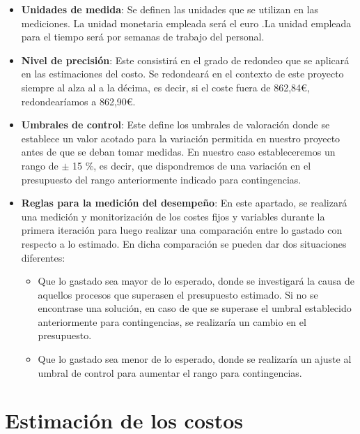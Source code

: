 \begin{itemize}

\item \textbf{Unidades de medida}: Se definen las unidades que se utilizan en las mediciones. La unidad monetaria empleada será el euro .La unidad empleada para el tiempo será por semanas de trabajo del personal.
\item \textbf{Nivel de precisión}: Este consistirá en el grado de redondeo que se aplicará en las estimaciones del costo. Se redondeará en el contexto de este proyecto siempre al alza al a la décima, es decir, si el coste fuera de 862,84\euro, redondearíamos a 862,90\euro.
\item \textbf{Umbrales de control}: Este define los umbrales de valoración donde se establece un valor acotado para la variación permitida en nuestro proyecto antes de que se deban tomar medidas. En nuestro caso estableceremos un rango de $\pm$ 15 \%, es decir, que dispondremos de una variación en el presupuesto del rango anteriormente indicado para contingencias.

\item \textbf{Reglas para la medición del desempeño}: En este apartado, se realizará una medición y monitorización de los costes fijos y variables durante la primera iteración para luego realizar una comparación entre lo gastado con respecto a lo estimado. En dicha comparación se pueden dar dos situaciones diferentes:  

\begin{itemize}

\item Que lo gastado sea mayor de lo esperado, donde se investigará la causa de aquellos procesos que superasen el presupuesto estimado. Si no se encontrase una solución, en caso de que se superase el umbral establecido anteriormente para contingencias, se realizaría un cambio en el presupuesto.

\item Que lo gastado sea menor de lo esperado, donde se realizaría un ajuste al umbral de control para aumentar el rango para contingencias.

\end{itemize}

\end{itemize}

\clearpage


\section{Estimación de los costos}

